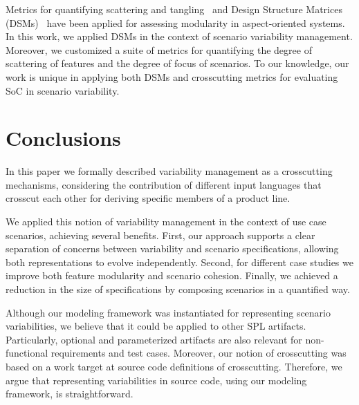 \documentclass{acm_proc_article-sp}
\begin{document}
Metrics for quantifying scattering and tangling~\cite{Eaddy:2007aa,Figueiredo:2008aa} and
Design Structure Matrices (DSMs)~\cite{Sullivan:2005aa,Lopes:2006aa}
have been applied for assessing modularity in aspect-oriented
systems. In this work, we applied
DSMs in the context of scenario variability management.
Moreover, we customized a suite of metrics for quantifying
the degree of scattering of features and the degree of focus of scenarios.
To our knowledge, our work is unique in applying both DSMs and crosscutting metrics for evaluating SoC in scenario variability.


\section{Conclusions}\label{sec:conclusions}

In this paper we formally described variability management as a
crosscutting mechanisms, considering the contribution
of different input languages that crosscut each other for deriving
specific members of a product line.

We applied this notion of variability management in the context of use
case scenarios, achieving several benefits. 
First, our approach supports
a clear separation of concerns between variability and scenario specifications,
allowing both representations to evolve independently. Second, for different case studies we improve both feature modularity and scenario cohesion. Finally, we achieved a reduction in the size of specifications by composing scenarios in a quantified way. 

Although our modeling framework was instantiated for representing
scenario variabilities, we believe that it could be applied to
other SPL artifacts. Particularly, optional and parameterized artifacts
are also relevant for non-functional requirements and test cases.
Moreover, our notion of crosscutting was based on a work target at source code definitions of crosscutting. Therefore,
we argue that representing variabilities in source code, using our modeling framework,
is straightforward.


%
%



\end{document}
